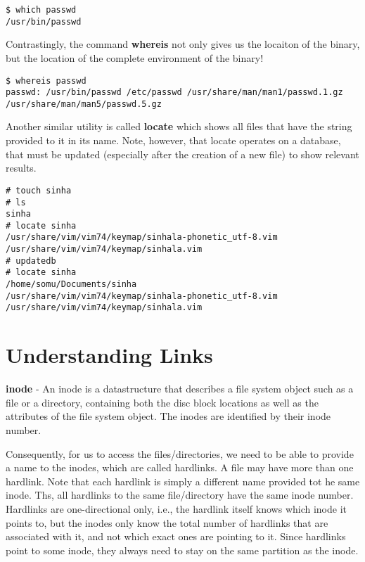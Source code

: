 \begin{verbatim}
$ which passwd
/usr/bin/passwd
\end{verbatim}

\noindent
Contrastingly, the command \textbf{whereis} not only gives us the locaiton of the binary, but the location of the complete environment of the binary!

\begin{verbatim}
$ whereis passwd
passwd: /usr/bin/passwd /etc/passwd /usr/share/man/man1/passwd.1.gz /usr/share/man/man5/passwd.5.gz
\end{verbatim}

\noindent
Another similar utility is called \textbf{locate} which shows all files that have the string provided to it in its name. Note, however, that locate operates on a database, that must be updated (especially after the creation of a new file) to show relevant results. 

\begin{verbatim}
# touch sinha
# ls
sinha
# locate sinha
/usr/share/vim/vim74/keymap/sinhala-phonetic_utf-8.vim
/usr/share/vim/vim74/keymap/sinhala.vim
# updatedb
# locate sinha
/home/somu/Documents/sinha
/usr/share/vim/vim74/keymap/sinhala-phonetic_utf-8.vim
/usr/share/vim/vim74/keymap/sinhala.vim
\end{verbatim}

\section{Understanding Links}
\textbf{inode} - An inode is a datastructure that describes a file system object such as a file or a directory, containing both the disc block locations as well as the attributes of the file system object. The inodes are identified by their inode number.

\noindent
Consequently, for us to access the files/directories, we need to be able to provide a name to the inodes, which are called hardlinks. A file may have more than one hardlink. Note that each hardlink is simply a different name provided tot he same inode. Ths, all hardlinks to the same file/directory have the same inode number. Hardlinks are one-directional only, i.e., the hardlink itself knows which inode it points to, but the inodes only know the total number of hardlinks that are associated with it, and not which exact ones are pointing to it. Since hardlinks point to some inode, they always need to stay on the same partition as the inode.


